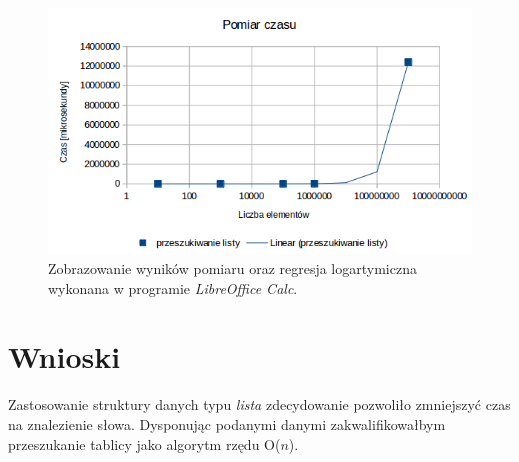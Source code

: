 \documentclass[11pt,a4paper]{article}
\begin{document}
\begin{figure}[h]

\begin{center}
	\includegraphics[scale=0.6]{../wyniki/wyniki_przeszukania.png}
\end{center}
\caption{Zobrazowanie wyników pomiaru oraz regresja logartymiczna wykonana w programie \textit{LibreOffice Calc}.}
\end{figure}
\newpage
\section{Wnioski}
\hspace{4ex}Zastosowanie struktury danych typu \textit{lista} zdecydowanie pozwoliło zmniejszyć czas na znalezienie słowa. Dysponując podanymi danymi zakwalifikowałbym przeszukanie tablicy jako algorytm rzędu O($n$).
\end{document}
